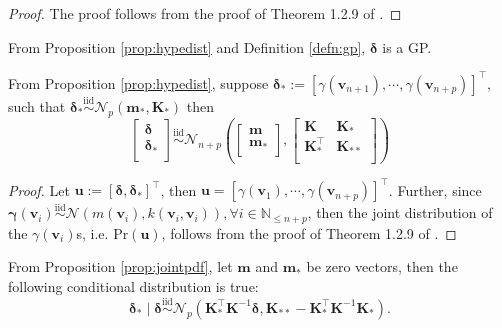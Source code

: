 \begin{proof}
    The proof follows from the proof of Theorem 1.2.9 of .
\end{proof}
\begin{remark}
    From Proposition \ref{prop:hypedist} and Definition \ref{defn:gp}, $\boldsymbol{\delta}$ is a GP.
\end{remark}
\begin{prop}\label{prop:jointpdf}
    From Proposition \ref{prop:hypedist}, suppose $\boldsymbol{\delta}_{*}:=[\gamma(\mathbf{v}_{n+1}),\cdots,\gamma(\mathbf{v}_{n+p})]^{\top}$, such that $\boldsymbol{\delta}_{*}\overset{\mathrm{iid}}{\sim}\mathcal{N}_p(\mathbf{m}_*,\mathbf{K}_*)$ then 
    \begin{equation}
        \left[
        \begin{matrix}
            \boldsymbol{\delta}\\
            \boldsymbol{\delta}_{*}\\
        \end{matrix}
        \right]\overset{\mathrm{iid}}{\sim}
        \mathcal{N}_{n+p}\left(\left[
        \begin{matrix}
            \mathbf{m}\\
            \mathbf{m}_{*}\\
        \end{matrix}
        \right],\left[
        \begin{matrix}
            \mathbf{K}&\mathbf{K}_{*}\\
            \mathbf{K}_{*}^{\top}&\mathbf{K}_{**}\\
        \end{matrix}
        \right]\right)
    \end{equation}
\end{prop}
\begin{proof}
    Let $\mathbf{u}:=[\boldsymbol{\delta},\boldsymbol{\delta}_{*}]^{\top}$, then $\mathbf{u}=[\gamma(\mathbf{v}_1),\cdots,\gamma(\mathbf{v}_{n+p})]^{\top}$. Further, since $\mathbf{\gamma}(\mathbf{v}_i)\overset{\mathrm{iid}}{\sim}\mathcal{N}(m(\mathbf{v}_i),k(\mathbf{v}_i,\mathbf{v}_i)),\forall i\in\mathbb{N}_{\leq n+p}$, then the joint distribution of the $\gamma(\mathbf{v}_i)$s, i.e. $\mathrm{Pr}(\mathbf{u})$, follows from the proof of Theorem 1.2.9 of .
\end{proof}
\begin{cor}\label{cor:condpdf}
From Proposition \ref{prop:jointpdf}, let $\mathbf{m}$ and $\mathbf{m}_{*}$ be zero vectors, then the following conditional distribution is true:
    \begin{equation}\label{eq:gp_updater}    \boldsymbol{\delta}_*\mid\boldsymbol{\delta}\overset{\mathrm{iid}}{\sim}\mathcal{N}_{p}(\mathbf{K}_{*}^{\top}\mathbf{K}^{-1}\boldsymbol{\delta},\mathbf{K}_{**}-\mathbf{K}_{*}^{\top}\mathbf{K}^{-1}\mathbf{K}_{*}).
\end{equation}
\end{cor}
